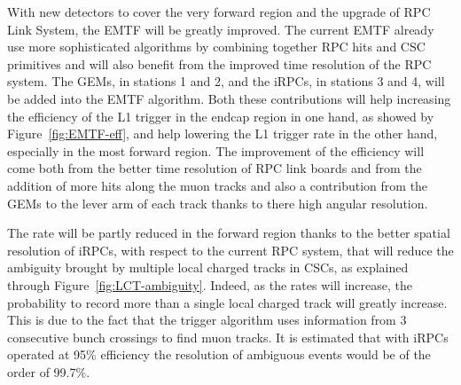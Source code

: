 	With new detectors to cover the very forward region and the upgrade of RPC Link System, the EMTF will be greatly improved. The current EMTF already use more sophisticated algorithms by combining together RPC hits and CSC primitives and will also benefit from the improved time resolution of the RPC system. The GEMs, in stations 1 and 2, and the iRPCs, in stations 3 and 4, will be added into the EMTF algorithm. Both these contributions will help increasing the efficiency of the L1 trigger in the endcap region in one hand, as showed by Figure~\ref{fig:EMTF-eff}, and help lowering the L1 trigger rate in the other hand, especially in the most forward region. The improvement of the efficiency will come both from the better time resolution of RPC link boards and from the addition of more hits along the muon tracks and also a contribution from the GEMs to the lever arm of each track thanks to there high angular resolution.
	
	The rate will be partly reduced in the forward region thanks to the better spatial resolution of iRPCs, with respect to the current RPC system, that will reduce the ambiguity brought by multiple local charged tracks in CSCs, as explained through Figure~\ref{fig:LCT-ambiguity}. Indeed, as the rates will increase, the probability to record more than a single local charged track will greatly increase. This is due to the fact that the trigger algorithm uses information from 3 consecutive bunch crossings to find muon tracks. It is estimated that with iRPCs operated at 95\% efficiency the resolution of ambiguous events would be of the order of 99.7\%.
	
